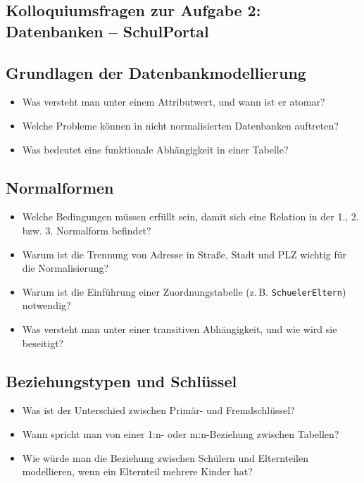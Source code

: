 \documentclass{article}
\begin{document}
\begin{enumerate}
	
	\section*{Kolloquiumsfragen zur Aufgabe 2: Datenbanken – SchulPortal}
	
	\subsection*{Grundlagen der Datenbankmodellierung}
	\begin{itemize}
		\item Was versteht man unter einem Attributwert, und wann ist er atomar?
		\item Welche Probleme können in nicht normalisierten Datenbanken auftreten?
		\item Was bedeutet eine funktionale Abhängigkeit in einer Tabelle?
	\end{itemize}
	
	\subsection*{Normalformen}
	\begin{itemize}
		\item Welche Bedingungen müssen erfüllt sein, damit sich eine Relation in der 1., 2. bzw. 3. Normalform befindet?
		\item Warum ist die Trennung von Adresse in Straße, Stadt und PLZ wichtig für die Normalisierung?
		\item Warum ist die Einführung einer Zuordnungstabelle (z.\,B. \texttt{SchuelerEltern}) notwendig?
		\item Was versteht man unter einer transitiven Abhängigkeit, und wie wird sie beseitigt?
	\end{itemize}
	
	\subsection*{Beziehungstypen und Schlüssel}
	\begin{itemize}
		\item Was ist der Unterschied zwischen Primär- und Fremdschlüssel?
		\item Wann spricht man von einer 1:n- oder m:n-Beziehung zwischen Tabellen?
		\item Wie würde man die Beziehung zwischen Schülern und Elternteilen modellieren, wenn ein Elternteil mehrere Kinder hat?
	\end{itemize}
	

\end{enumerate}
\end{document}

